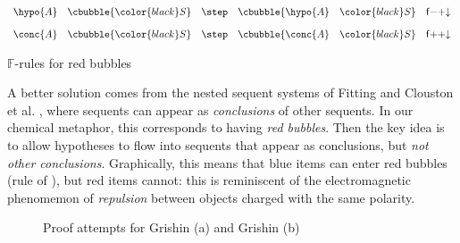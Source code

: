 \begin{marginfigure}
  $$
  \begin{array}{rclr}
    \hypo{A}~~~\cbubble{\color{black}S} &\step &\cbubble{\hypo{A}~~~\color{black}S} &\mathsf{f}{-}{+}{\downarrow} \vspace{1em}\\
    \conc{A}~~~\cbubble{\color{black}S} &\step &\cbubble{\conc{A}~~~\color{black}S} &\mathsf{f}{+}{+}{\downarrow} \\
  \end{array}
  $$
  \caption{$\mathbb{F}$-rules for red bubbles}
\end{marginfigure}

A better solution comes from the nested sequent systems of Fitting
 and Clouston et al.
, where sequents can appear as
\emph{conclusions} of other sequents. In our chemical metaphor, this corresponds
to having \emph{red bubbles}. Then the key idea is to allow hypotheses to flow
into sequents that appear as conclusions, but \emph{not other conclusions}.
Graphically, this means that blue items can enter red bubbles (rule
{} of ), but red items cannot: this is
reminiscent of the electromagnetic phenomemon of \emph{repulsion} between
objects charged with the same polarity.

\begin{figure*}
  
  \caption{Proof attempts for Grishin (a) and Grishin (b)}
\end{figure*}

